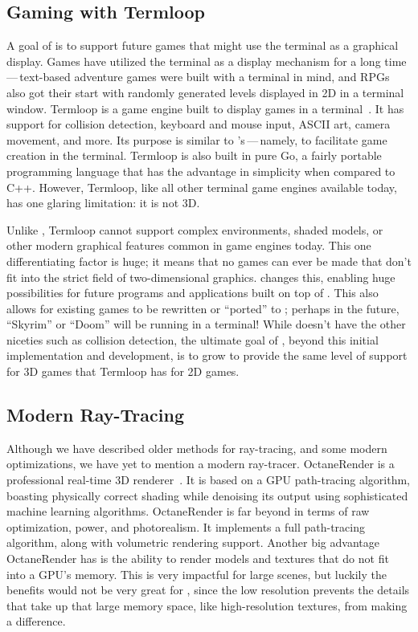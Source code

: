 \subsection{Gaming with Termloop}

A goal of \name{} is to support future games that might use the terminal as a graphical display.
Games have utilized the terminal as a display mechanism for a long time\,---\,text-based adventure games were built with a terminal in mind, and RPGs also got their start with randomly generated levels displayed in 2D in a terminal window.
Termloop is a game engine built to display games in a terminal~\cite{termloop}.
It has support for collision detection, keyboard and mouse input, ASCII art, camera movement, and more.
Its purpose is similar to \name{}'s\,---\,namely, to facilitate game creation in the terminal.
Termloop is also built in pure Go, a fairly portable programming language that has the advantage in simplicity when compared to C++.
However, Termloop, like all other terminal game engines available today, has one glaring limitation: it is not 3D.

Unlike \name{}, Termloop cannot support complex environments, shaded models, or other modern graphical features common in game engines today.
This one differentiating factor is huge; it means that no games can ever be made that don't fit into the strict field of two-dimensional graphics.
 \name{} changes this, enabling huge possibilities for future programs and applications built on top of \name{}.
This also allows for existing games to be rewritten or ``ported'' to \name{}; perhaps in the future, ``Skyrim'' or ``Doom'' will be running in a terminal!
While \name{} doesn't have the other niceties such as collision detection, the ultimate goal of \name{}, beyond this initial implementation and development, is to grow to provide the same level of support for 3D games that Termloop has for 2D games.

\subsection{Modern Ray-Tracing}

Although we have described older methods for ray-tracing, and some modern optimizations, we have yet to mention a modern ray-tracer.
OctaneRender is a professional real-time 3D renderer~\cite{octane}.
It is based on a GPU path-tracing algorithm, boasting physically correct shading while denoising its output using sophisticated machine learning algorithms.
OctaneRender is far beyond \name{} in terms of raw optimization, power, and photorealism.
It implements a full path-tracing algorithm, along with volumetric rendering support.
Another big advantage OctaneRender has is the ability to render models and textures that do not fit into a GPU's memory.
This is very impactful for large scenes, but luckily the benefits would not be very great for \name{}, since the low resolution prevents the details that take up that large memory space, like high-resolution textures, from making a difference.

